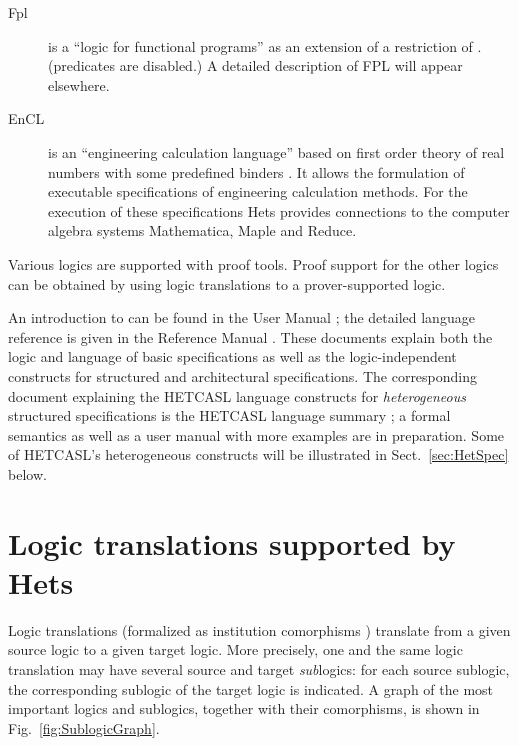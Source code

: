 \documentclass{article}
\newcommand{\normalTEXTSC}[2]{{#1\scriptsize#2}}
\newcommand{\HetCASL}{\normalTEXTSC{H}{ET}\normalTEXTSC{C}{ASL}\xspace}
\begin{document}
\begin{description}
\item[Fpl] is a ``logic for functional programs'' as an extension of a
  restriction of \CASL. (\CASL predicates are disabled.)
  A detailed description of FPL will appear elsewhere.

\item[EnCL] is an ``engineering calculation language'' based on first
  order theory of real numbers with some predefined binders
  \cite{logic:EnCL}.  It allows the formulation of executable
  specifications of engineering calculation methods. For the execution
  of these specifications Hets provides connections to the computer
  algebra systems Mathematica, Maple and Reduce.
\end{description}

Various logics are supported with proof tools. Proof support for the
other logics can be obtained by using logic translations to a
prover-supported logic.


An introduction to \CASL can be found in the \CASL User Manual
\cite{CASL-UM}; the detailed language reference is given in
the \CASL Reference Manual \cite{CASL/RefManual}.  These documents
explain both the \CASL logic and language of basic specifications as
well as the logic-independent constructs for structured and
architectural specifications.  The corresponding document explaining the
\HetCASL language constructs for \emph{heterogeneous} structured specifications
is the \HetCASL language summary \cite{Mossakowski04}; a formal
semantics as well as a user manual with more examples are in preparation.
Some of \HetCASL's heterogeneous constructs will be illustrated
in Sect.~\ref{sec:HetSpec} below.

\section{Logic translations supported
by Hets}
\label{comorphisms}

Logic translations (formalized as institution comorphisms
\cite{GoguenRosu02}) translate from a given source logic to a given
target logic. More precisely, one and the same logic translation
may have several source and target \emph{sub}logics: for
each source sublogic, the corresponding sublogic of the target
logic is indicated.
A graph of the most important logics and sublogics, together with their
comorphisms, is shown in Fig.~\ref{fig:SublogicGraph}.
\end{document}
